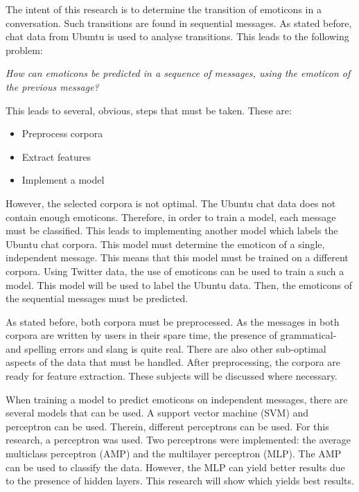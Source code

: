 
\begin{comment}
Problem: (roughly 1-2 pages)
• Explain the problem; what kind of assumptions / observations you have about the problem

\red{Find out what should be actually in this section} \\
\end{comment}

The intent of this research is to determine the transition of emoticons in a conversation. Such transitions are found in sequential messages. As stated before, chat data from Ubuntu is used to analyse transitions. This leads to the following problem: 
\begin{center}
\textit{How can emoticons be predicted in a sequence of messages, using the emoticon of the previous message?}
\end{center}

This leads to several, obvious, steps that must be taken. These are:
\begin{itemize}
\item Preprocess corpora
\item Extract features
\item Implement a model
\end{itemize}

However, the selected corpora is not optimal. The Ubuntu chat data does not contain enough emoticons. Therefore, in order to train a model, each message must be classified. This leads to implementing another model which labels the Ubuntu chat corpora. This model must determine the emoticon of a single, independent message. This means that this model must be trained on a different corpora. Using Twitter data, the use of emoticons can be used to train a such a model. This model will be used to label the Ubuntu data. Then, the emoticons of the sequential messages must be predicted.

As stated before, both corpora must be preprocessed. As the messages in both corpora are written by users in their spare time, the presence of grammatical- and spelling errors and slang is quite real. There are also other sub-optimal aspects of the data that must be handled. After preprocessing, the corpora are ready for feature extraction. These subjects will be discussed where necessary.

When training a model to predict emoticons on independent messages, there are several models that can be used. A support vector machine (SVM) and perceptron can be used. Therein, different perceptrons can be used. For this research, a perceptron was used. Two perceptrons were implemented: the average multiclass perceptron (AMP) and the multilayer perceptron (MLP). The AMP can be used to classify the data. However, the MLP can yield better results due to the presence of hidden layers. This research will show which yields best results.

